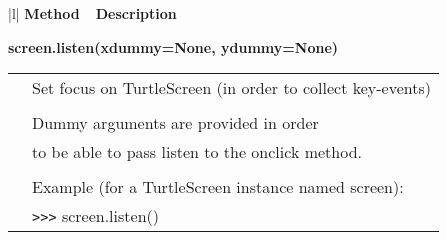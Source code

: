 \begin{center}
{\small
\begin{tabular}{|l|} \hline
{\bf Method~~Description}  \\ \hline\hline 


{\bf    screen.listen(xdummy=None, ydummy=None)} \\
   \begin{tabular}{p{0.25in}p{4in}}
&        Set focus on TurtleScreen (in order to collect key-events) \\
&  \\
&        Dummy arguments are provided in order \\
&        to be able to pass listen to the onclick method. \\
&  \\
&        Example (for a TurtleScreen instance named screen): \\
&        \verb+>+\verb+>+\verb+>+ screen.listen() \\
\end{tabular} \\ \hline



\end{tabular}}
\end{center}
